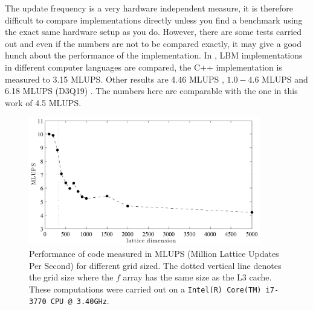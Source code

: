The update frequency is a very hardware independent measure, it is
therefore difficult to compare implementations directly unless you
find a benchmark using the exact same hardware setup as you
do. However, there are some tests carried out and even if the numbers
are not to be compared exactly, it may give a good hunch about the
performance of the implementation. In \cite{palabos}, LBM
implementations in different computer languages are compared, the C++
implementation is measured to 3.15 MLUPS. Other results are 4.46 MLUPS
\cite{lbm_bench_thomas}, $1.0-4.6$ MLUPS \cite{lbm_bench_mattila} and
6.18 MLUPS (D3Q19) \cite{lbm_bench_bailey}. The numbers here are
comparable with the one in this work of 4.5 MLUPS.

\begin{figure}
\begin{center}
\includegraphics[width=0.9\textwidth]{fig/mlups.pdf}
\end{center}
\caption[Performance of code for different grid sizes.]{Performance of
  code measured in MLUPS (Million Lattice Updates Per Second) for
  different grid sized. The dotted vertical line denotes the grid size
  where the $f$ array has the same size as the L3 cache. These
  computations were carried out on a \texttt{Intel(R) Core(TM) i7-3770
    CPU @ 3.40GHz}.}
\label{fig:hpc:mlups}
\end{figure}


